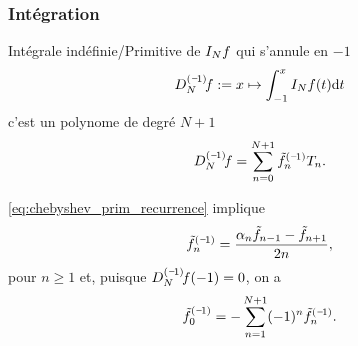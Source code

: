 
\subsubsection{Intégration}
Intégrale indéfinie/Primitive de $\interpolant{f}{N}$ qui s'annule en $-1$
\begin{equation}
	\interpprim{f}{N} := x \mapsto \int_{-1}^{x} \interpolant{f}{N}(t) \dx{t}
\end{equation}
c'est un polynome de degré $N+1$
\begin{equation}
	\interpprim{f}{N} = \sum_{n=0}^{N+1} \prim{\tilde{f}}{1}_n T_n.
\end{equation}

\eqref{eq:chebyshev_prim_recurrence} implique 
\begin{equation}
	\prim{\tilde{f}}{1}_n = \frac{\alpha_n \tilde{f}_{n-1} - \tilde{f}_{n+1}}{2n},
\end{equation}
pour $n \geq 1$ et, puisque $\interpprim{f}{N}(-1) = 0$, on a
\begin{equation}
	\prim{\tilde{f}}{1}_0 = - \sum_{n=1}^{N+1} (-1)^n \prim{\tilde{f}}{1}_n.
\end{equation}


